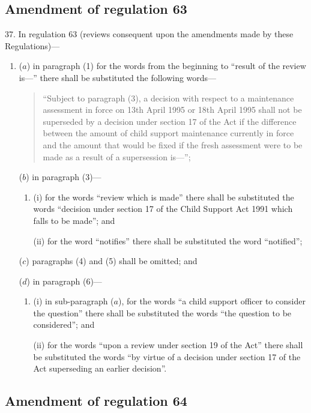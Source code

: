 \documentclass[12pt,a4paper]{article}
\begin{document}
\renewcommand\parthead{--- Part X}

\subsection[37. Amendment of regulation 63]{Amendment of regulation 63}

37.  In regulation 63 (reviews consequent upon the amendments made by these Regulations)—
\begin{enumerate}\item[]
($a$) in paragraph (1) for the words from the beginning to “result of the review is—” there shall be substituted the following words—
\begin{quotation}
    “Subject to paragraph (3), a decision with respect to a maintenance assessment in force on 13th April 1995 or 18th April 1995 shall not be superseded by a decision under section 17 of the Act if the difference between the amount of child support maintenance currently in force and the amount that would be fixed if the fresh assessment were to be made as a result of a supersession is—”; 
\end{quotation}

($b$) in paragraph (3)—
\begin{enumerate}\item[]
(i) for the words “review which is made” there shall be substituted the words “decision under section 17 of the Child Support Act 1991 which falls to be made”; and

(ii) for the word “notifies” there shall be substituted the word “notified”;
\end{enumerate}

($c$) paragraphs (4) and (5) shall be omitted; and

($d$) in paragraph (6)—
\begin{enumerate}\item[]
(i) in sub-paragraph ($a$), for the words “a child support officer to consider the question” there shall be substituted the words “the question to be considered”; and

(ii) for the words “upon a review under section 19 of the Act” there shall be substituted the words “by virtue of a decision under section 17 of the Act superseding an earlier decision”.
\end{enumerate}
\end{enumerate}

\subsection[38. Amendment of regulation 64]{Amendment of regulation 64}
\end{document}
